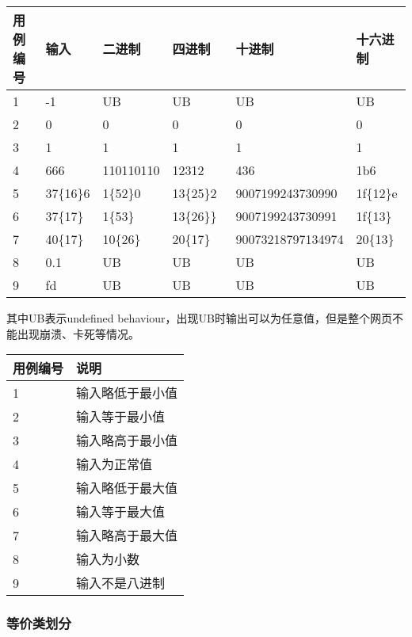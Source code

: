 \documentclass[12pt, a4paper, oneside]{ctexart}
\begin{document}
\begin{table}

\begin{tabular}{|l|l|l|l|l|l|}
\hline
用例编号 & 输入 & 二进制 & 四进制  & 十进制 & 十六进制\\ \hline
1 & -1 & UB & UB & UB  & UB \\ \hline
2 & 0 & 0 & 0 & 0  & 0 \\ \hline
3 & 1 & 1 & 1 &  1 & 1 \\ \hline
4 & 666 & 110110110 & 12312 & 436 & 1b6 \\ \hline
5 & 37\{16\}6 & 1\{52\}0  & 13\{25\}2 & 9007199243730990 & 1f\{12\}e \\ \hline
6 & 37\{17\}  & 1\{53\} & 13\{26\}\}\ &    9007199243730991 & 1f\{13\} \\ \hline
7 & 40\{17\} & 10\{26\} & 20\{17\} &    90073218797134974 & 20\{13\}  \\ \hline
8 & 0.1 & UB & UB  & UB & UB  \\ \hline
9 & fd & UB & UB  & UB & UB  \\ \hline

\end{tabular}
\end{table}
其中UB表示undefined behaviour，出现UB时输出可以为任意值，但是整个网页不能出现崩溃、卡死等情况。
\begin{table}[!h]
    \begin{tabular}{|l|l|}
    \hline
    用例编号 & 说明\\ \hline
    1 & 输入略低于最小值\\ \hline
    2 & 输入等于最小值\\ \hline
    3 & 输入略高于最小值 \\ \hline
    4 & 输入为正常值 \\ \hline   
    5 & 输入略低于最大值\\ \hline
    6 & 输入等于最大值 \\ \hline
    7 & 输入略高于最大值 \\ \hline
    8 & 输入为小数 \\ \hline
    9 & 输入不是八进制 \\ \hline
    \end{tabular}
\end{table}


\subsubsection{等价类划分}
\end{document}
